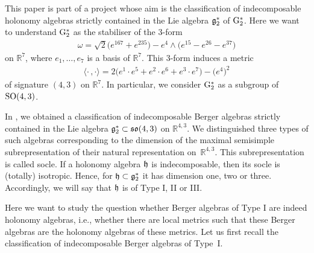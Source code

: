 \documentclass[pdftex]{sigma}
\numberwithin{equation}{section}
\newcommand\fg{{\frak{g}}}
\newcommand\fh{{\frak h}}
\newcommand{\fso}{\mathop{{\frak s \frak o}}}
\newcommand\RR{{\mathbb R}}
\newcommand{\SO}{\mathop{{\rm SO}}}
\newcommand{\G}{\mathop{{{\rm G}_{2}^*}}}
\newcommand\ip{{\langle\cdot \,,\cdot \rangle}}
\begin{document}
This paper is part of a project whose aim is the classification of indecomposable holonomy algebras strictly contained in the Lie algebra $\fg^*_2$ of $\G$. Here we want to understand $\G$ as the stabiliser of the 3-form
\begin{gather}\label{Eomega1}
\omega=\sqrt 2\big(e^{167}+e^{235}\big)-e^4\wedge \big(e^{15}-e^{26}-e^{37}\big)
\end{gather}
on $\RR^7$, where $e_1,\dots,e_7$ is a basis of $\RR^7$. This 3-form induces a metric
\begin{gather}
\ip = 2\big(e^1\cdot e^5+e^2\cdot e^6+e^3\cdot e^7\big)- \big(e^4\big)^2 \label{Eip1}
\end{gather}
of signature $(4,3)$ on $\RR^7$. In particular, we consider $\G$ as a subgroup of $\SO(4,3)$.

In \cite{FK}, we obtained a classification of indecomposable Berger algebras strictly contained in the Lie algebra $\fg^*_2\subset \fso(4,3)$ on $\RR^{4,3}$. We distinguished three types of such algebras corresponding to the dimension of the maximal semisimple subrepresentation of their natural representation on~${\mathbb R}^{4,3}$. This subrepresentation is called socle. If a holonomy algebra $\fh$ is indecomposable, then its socle is (totally) isotropic. Hence, for $\fh\subset\fg_2^*$ it has dimension one, two or three. Accordingly, we will say that $\frak h$ is of Type I, II or III.

Here we want to study the question whether Berger algebras of Type I are indeed holonomy algebras, i.e., whether there are local metrics such that these Berger algebras are the holonomy algebras of these metrics. Let us first recall the classification of indecomposable Berger algebras of Type~I.
\end{document}
